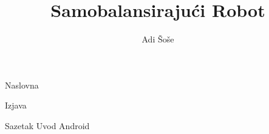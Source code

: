 \documentclass[12pt,a4paper]{article}
\title{Samobalansirajući Robot}
\author{Adi Šoše}
\begin{document}

{Naslovna}

{Izjava}
\pagebreak

\setcounter{page}{1}
\renewcommand*\contentsname{Sadržaj}
\tableofcontents

\pagebreak
{}


{Sazetak}
{Uvod}
{Android}
\end{document}
